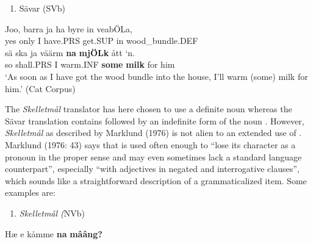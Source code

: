 \begin{enumerate} %
\item 
Sävar (SVb)

\end{enumerate} %
\ea\label{}
\gll Joo,  barra  ja  ha  byre  in  veabÖLa,  \\


yes  only  I  have.PRS  get.SUP  in  wood\_bundle.DEF  \\ %


\ea\label{}
\gll sä  ska  ja  väärm  \textbf{na} \textbf{mjÖLk} ått  ‘n.\\


so  shall.PRS  I  warm.INF  \textbf{some} \textbf{milk} for   him\\ %


‘As soon as I have got the wood bundle into the house, I’ll warm (some) milk for him.’ (Cat Corpus)
\z


The \textit{Skelletmål} translator has here chosen to use a definite noun whereas the Sävar translation contains followed by an indefinite form of the noun . However, \textit{Skelletmål} as described by Marklund (1976) is not alien to an extended use of . Marklund (1976: 43) says that  is used often enough to “lose its character as a pronoun in the proper sense and may even sometimes lack a standard language counterpart”, especially “with adjectives in negated and interrogative clauses”, which sounds like a straightforward description of a grammaticalized item. Some examples are:

\begin{enumerate} %
\item 
\textit{Skelletmål (}NVb)
\end{enumerate} %
\ea\label{}
\gll Hæ  e  kåmme  \textbf{na}\textbf{  mââng?}\\


